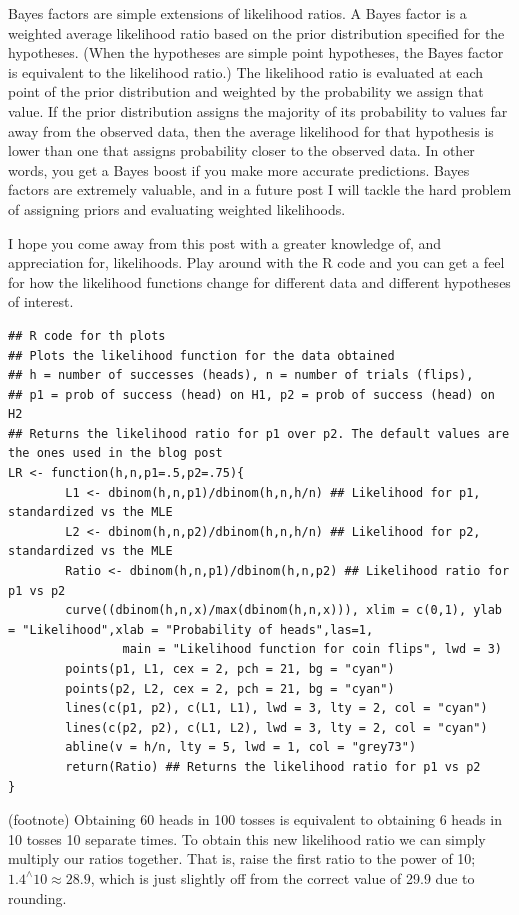 Bayes factors are simple extensions of likelihood ratios. A Bayes factor is a weighted average likelihood ratio based on the prior distribution specified for the hypotheses. (When the hypotheses are simple point hypotheses, the Bayes factor is equivalent to the likelihood ratio.) The likelihood ratio is evaluated at each point of the prior distribution and weighted by the probability we assign that value. If the prior distribution assigns the majority of its probability to values far away from the observed data, then the average likelihood for that hypothesis is lower than one that assigns probability closer to the observed data. In other words, you get a Bayes boost if you make more accurate predictions. Bayes factors are extremely valuable, and in a future post I will tackle the hard problem of assigning priors and evaluating weighted likelihoods.

I hope you come away from this post with a greater knowledge of, and appreciation for, likelihoods. Play around with the R code and you can get a feel for how the likelihood functions change for different data and different hypotheses of interest.


\begin{lstlisting}
## R code for th plots
## Plots the likelihood function for the data obtained
## h = number of successes (heads), n = number of trials (flips), 
## p1 = prob of success (head) on H1, p2 = prob of success (head) on H2
## Returns the likelihood ratio for p1 over p2. The default values are the ones used in the blog post
LR <- function(h,n,p1=.5,p2=.75){
        L1 <- dbinom(h,n,p1)/dbinom(h,n,h/n) ## Likelihood for p1, standardized vs the MLE
        L2 <- dbinom(h,n,p2)/dbinom(h,n,h/n) ## Likelihood for p2, standardized vs the MLE
        Ratio <- dbinom(h,n,p1)/dbinom(h,n,p2) ## Likelihood ratio for p1 vs p2
        curve((dbinom(h,n,x)/max(dbinom(h,n,x))), xlim = c(0,1), ylab = "Likelihood",xlab = "Probability of heads",las=1,
                main = "Likelihood function for coin flips", lwd = 3)
        points(p1, L1, cex = 2, pch = 21, bg = "cyan")
        points(p2, L2, cex = 2, pch = 21, bg = "cyan")
        lines(c(p1, p2), c(L1, L1), lwd = 3, lty = 2, col = "cyan")
        lines(c(p2, p2), c(L1, L2), lwd = 3, lty = 2, col = "cyan")
        abline(v = h/n, lty = 5, lwd = 1, col = "grey73")
        return(Ratio) ## Returns the likelihood ratio for p1 vs p2
}
\end{lstlisting}

(footnote) Obtaining 60 heads in 100 tosses is equivalent to obtaining 6 heads in 10 tosses 10 separate times. To obtain this new likelihood ratio we can simply multiply our ratios together. That is, raise the first ratio to the power of 10; $1.4^{\wedge} 10 \approx 28.9$, which is just slightly off from the correct value of 29.9 due to rounding.

